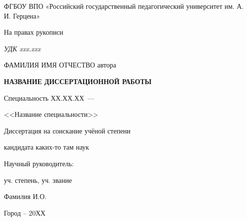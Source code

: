 \thispagestyle{empty}

\begin{center}
ФГБОУ ВПО «Российский государственный педагогический университет
им. А. И. Герцена» \par 
\par
\end{center}

\vspace{20mm}
\begin{flushright}
На правах рукописи

{\sl УДК xxx.xxx}
\end{flushright}

\vspace{30mm}
\begin{center}
{\large ФАМИЛИЯ ИМЯ ОТЧЕСТВО автора}
\end{center}

\vspace{5mm}
\begin{center}
{\bf \large НАЗВАНИЕ ДИССЕРТАЦИОННОЙ РАБОТЫ
\par}

\vspace{10mm}
{%
Специальность ХХ.ХХ.ХХ~---

<<Название специальности>>
}

\vspace{10mm}
Диссертация на соискание учёной степени

кандидата каких-то там наук
\end{center}

\vspace{20mm}
\begin{flushright}
Научный руководитель:

уч. степень, уч. звание

Фамилия И.О.

\end{flushright}

\vspace{20mm}
\begin{center}
{Город -- 20ХХ}
\end{center}

\newpage